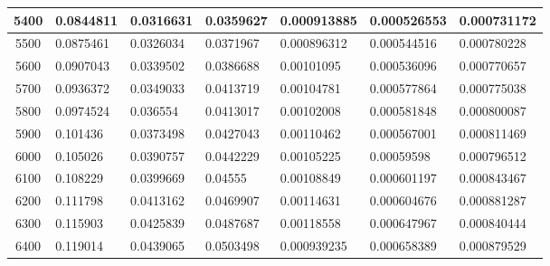 \documentclass[11pt,spanish]{article} %
\begin{document}
\begin{center}
\begin{longtable}{|c|l|l|l|l|l|l|}
5400 & 0.0844811                    & 0.0316631                      & 0.0359627                      & 0.000913885                    & 0.000526553                    & 0.000731172                   \\ \hline
5500 & 0.0875461                    & 0.0326034                      & 0.0371967                      & 0.000896312                    & 0.000544516                    & 0.000780228                   \\ \hline
5600 & 0.0907043                    & 0.0339502                      & 0.0386688                      & 0.00101095                     & 0.000536096                    & 0.000770657                   \\ \hline
5700 & 0.0936372                    & 0.0349033                      & 0.0413719                      & 0.00104781                     & 0.000577864                    & 0.000775038                   \\ \hline
5800 & 0.0974524                    & 0.036554                       & 0.0413017                      & 0.00102008                     & 0.000581848                    & 0.000800087                   \\ \hline
5900 & 0.101436                     & 0.0373498                      & 0.0427043                      & 0.00110462                     & 0.000567001                    & 0.000811469                   \\ \hline
6000 & 0.105026                     & 0.0390757                      & 0.0442229                      & 0.00105225                     & 0.00059598                     & 0.000796512                   \\ \hline
6100 & 0.108229                     & 0.0399669                      & 0.04555                        & 0.00108849                     & 0.000601197                    & 0.000843467                   \\ \hline
6200 & 0.111798                     & 0.0413162                      & 0.0469907                      & 0.00114631                     & 0.000604676                    & 0.000881287                   \\ \hline
6300 & 0.115903                     & 0.0425839                      & 0.0487687                      & 0.00118558                     & 0.000647967                    & 0.000840444                   \\ \hline
6400 & 0.119014                     & 0.0439065                      & 0.0503498                      & 0.000939235                    & 0.000658389                    & 0.000879529                   \\ \hline

\end{longtable}
\end{center}
\end{document}
